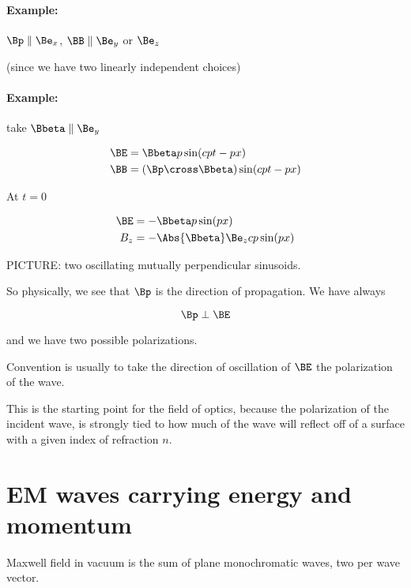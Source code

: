 \paragraph{Example:} $\Bp \parallel \Be_x$, $\BB \parallel \Be_y$ or $\Be_z$

(since we have two linearly independent choices)

\paragraph{Example:} take $\Bbeta \parallel \Be_y$

\begin{align}\label{eqn:relativisticElectrodynamicsL16:290}
\BE &= \Bbeta p \sin(c p t - p x)  \\
\BB &= (\Bp \cross \Bbeta) \sin(c p t - p x)
\end{align}

At $t = 0$

\begin{align}\label{eqn:relativisticElectrodynamicsL16:310}
\BE &= -\Bbeta p \sin( p x)  \\
B_z &= - \Abs{\Bbeta} \Be_z c p \sin(p x)
\end{align}

PICTURE: two oscillating mutually perpendicular sinusoids.

So physically, we see that $\Bp$ is the direction of propagation.  We have always

\begin{equation}\label{eqn:relativisticElectrodynamicsL16:330}
\Bp \perp \BE
\end{equation}

and we have two possible polarizations.

Convention is usually to take the direction of oscillation of $\BE$ the polarization of the wave.

This is the starting point for the field of optics, because the polarization of the incident wave, is strongly tied to how much of the wave will reflect off of a surface with a given index of refraction $n$.

\section{EM waves carrying energy and momentum}

Maxwell field in vacuum is the sum of plane monochromatic waves, two per wave vector.

